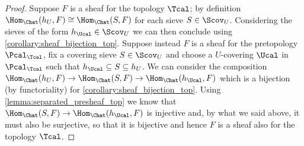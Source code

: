 \documentclass[a4paper]{article}
\begin{document}
         \begin{proof}
             Suppose $F$ is a sheaf for the topology $\Tcal$; by definition $\Hom_{\Chat}(h_U, F) \cong \Hom_{\Chat}(S, F)$ for each sieve $S \in \Scov_U$. Considering the sieves of the form $h_{\Ucal} \in \Scov_U$ we can then conclude using \cref{corollary:sheaf_bijection_top}.
             Suppose instead $F$ is a sheaf for the pretopology $\Pcal_{\Tcal}$, fix a covering sieve $S \in \Scov_U$ and choose a $U$-covering $\Ucal$ in $\Pcal_{\Tcal}$ such that $h_{\Ucal} \subseteq S \subseteq h_U$. We can consider the composition $\Hom_{\Chat}(h_U, F) \to \Hom_{\Chat}(S, F) \to \Hom_{\Chat}(h_{\Ucal}, F)$ which is a bijection (by functoriality) for \cref{corollary:sheaf_bijection_top}. Using \cref{lemma:separated_presheaf_top} we know that $\Hom_{\Chat}(S, F) \to \Hom_{\Chat}(h_{\Ucal}, F)$ is injective and, by what we said above, it must also be surjective, so that it is bijective and hence $F$ is a sheaf also for the topology $\Tcal$.
         \end{proof}
\end{document}
